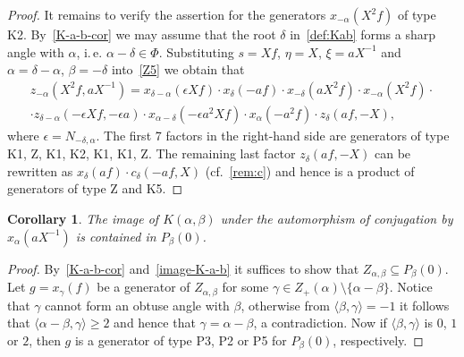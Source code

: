 \documentclass[oneside, 8pt]{amsart}
\newtheorem{corollary}[lemma]{Corollary}
\theoremstyle{remark}
\theoremstyle{definition}
\numberwithin{lemma}{section}
\numberwithin{prop}{section}
\numberwithin{corollary}{section}
\numberwithin{externaltheorem}{section}
\numberwithin{equation}{section}
\begin{document}
\begin{proof}
It remains to verify the assertion for the generators $x_{-\alpha}(X^2f) $ of type K2.
By~\cref{K-a-b-cor} we may assume that the root $\delta$ in~\cref{def:Kab} forms a sharp angle with $\alpha$, i.\,e. $\alpha-\delta \in \Phi$. Substituting $s = Xf$, $\eta = X$, $\xi = aX^{-1}$ and $\alpha = \delta-\alpha$, $\beta = -\delta$ into~\eqref{Z5} we obtain that
\begin{multline*} z_{-\alpha}(X^2f, aX^{-1}) = x_{\delta-\alpha}(\epsilon Xf) \cdot x_{\delta}(-af) \cdot x_{-\delta}(aX^2 f) \cdot x_{-\alpha}(X^2f) \cdot \\
 \cdot z_{\delta-\alpha}(-\epsilon Xf, -\epsilon a) \cdot x_{\alpha-\delta}(-\epsilon a^2 Xf) \cdot x_{\alpha}(- a^2 f) \cdot z_{\delta}(a f, -X), \end{multline*}
where $\epsilon = N_{-\delta,\alpha}$. 
The first 7 factors in the right-hand side are generators of type K1, Z, K1, K2, K1, K1, Z.
The remaining last factor $z_\delta(af, -X)$ can be rewritten as $x_{\delta}(af) \cdot c_{\delta}(-af, X)$ (cf.~\cref{rem:c}) and hence is a product of generators of type Z and K5. \end{proof}

\begin{corollary} \label{K-a-b-P-b} The image of $K(\alpha, \beta)$ under the automorphism of conjugation by $x_\alpha(aX^{-1})$ is contained in $P_\beta(0)$. \end{corollary}
\begin{proof} 
By~\cref{K-a-b-cor} and~\cref{image-K-a-b} it suffices to show that $Z_{\alpha, \beta} \subseteq P_\beta(0)$. Let $g = x_{\gamma}(f)$ be a generator of $Z_{\alpha, \beta}$ for some
$\gamma \in Z_+(\alpha) \setminus \{\alpha - \beta \}$. Notice that $\gamma$ cannot form an obtuse angle with $\beta$, otherwise from $\langle \beta, \gamma \rangle = -1$ it follows that $ \langle \alpha - \beta, \gamma \rangle \geq 2$ and hence that $\gamma = \alpha - \beta$, a contradiction.
Now if $\langle \beta, \gamma \rangle$ is $0$, $1$ or $2$, then $g$ is a generator of type P3, P2 or P5 for $P_\beta(0)$, respectively.\end{proof}
\end{document}

